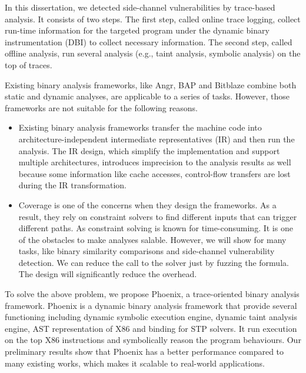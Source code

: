 In this dissertation, we detected side-channel vulnerabilities by trace-based analysis.
It consists of two steps. The first step, called online trace logging, collect run-time
information for the targeted program under the dynamic binary instrumentation (DBI)
to collect necessary information. The second step, called offline analysis, run
several analysis (e.g., taint analysis, symbolic analysis) on the top of traces.  

Existing binary analysis frameworks, like Angr, BAP and Bitblaze combine both static
and dynamic analyses, are applicable to a series of tasks. However, those frameworks
are not suitable for the following reasons. 
\begin{itemize}
    \item Existing binary analysis frameworks transfer the machine code into
    architecture-independent intermediate representatives (IR) and then run the
    analysis. The IR design, which simplify the implementation and support multiple
    architectures, introduces imprecision to the analysis results as well because some
    information like cache accesses, control-flow transfers are lost during the IR
    transformation.
    \item Coverage is one of the concerns when they design the frameworks. 
    As a result, they rely on constraint solvers to find different inputs that can
    trigger different paths. As constraint solving is known for time-consuming. It is
    one of the obstacles to make analyses salable.
    However, we will show for many tasks, like binary similarity comparisons and side-channel vulnerability detection. We can
    reduce the call to the solver just by fuzzing the formula. The design will
    significantly reduce the overhead.
\end{itemize}
To solve the above problem, we propose Phoenix, a trace-oriented binary analysis
framework. Phoenix is a dynamic binary analysis framework that provide several 
functioning including dynamic symbolic execution engine, dynamic taint analysis
engine, AST representation of X86 and binding for STP solvers. It run 
execution on the top X86 instructions and symbolically reason the program behaviours.
Our preliminary results show that Phoenix has a better performance compared to 
many existing works, which makes it scalable to real-world applications.
